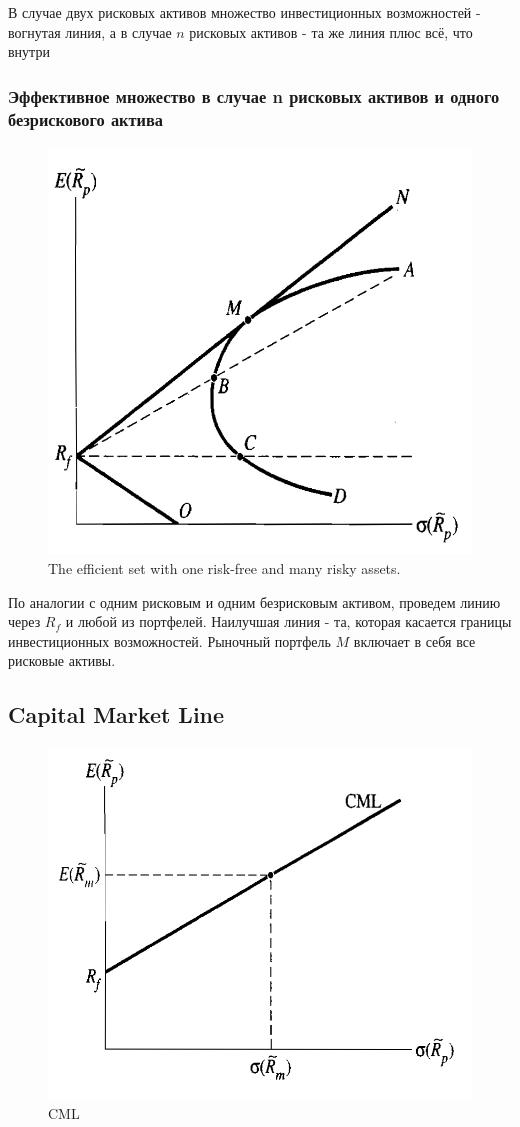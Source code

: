 \documentclass[a4paper,12pt]{article} %
\begin{document}
        
        
        
        В случае двух рисковых активов множество инвестиционных  возможностей - вогнутая  линия, а в случае $ n $  рисковых активов - та же линия плюс  всё, что внутри
   
   

   
   \subsubsection{Эффективное множество в случае n рисковых активов и одного безрискового актива    }
   
   
   \begin{figure}[h!]
   	\centering
   	\includegraphics[width=0.4\linewidth]{screenshot013}
   	\caption{The efficient set with one risk-free and many risky assets.}
   	\label{fig:screenshot013}
   \end{figure}
   
   
    По аналогии с одним рисковым и одним безрисковым активом, проведем линию через $ R_f $  и любой из портфелей.
     Наилучшая  линия - та,  которая  касается границы инвестиционных возможностей. 
     Рыночный портфель $ M $ включает в себя все рисковые активы.
      
    
    \subsection{Capital Market Line}
      
      \begin{figure}[h!]
      	\centering
      	\includegraphics[width=0.4\linewidth]{screenshot014}
      	\caption{CML}
      	\label{fig:screenshot014}
      \end{figure}
      
\end{document}
